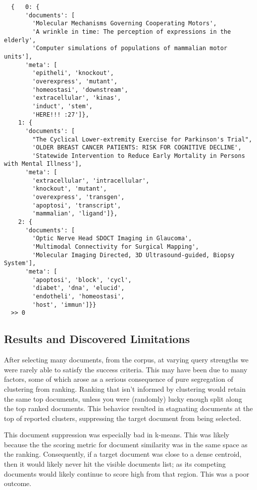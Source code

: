 \documentclass[11pt]{article}
\begin{document}
\begin{lstlisting}
  {   0: {
      'documents': [
        'Molecular Mechanisms Governing Cooperating Motors',
        'A wrinkle in time: The perception of expressions in the elderly',
        'Computer simulations of populations of mammalian motor units'],
      'meta': [
        'epitheli', 'knockout',
        'overexpress', 'mutant',
        'homeostasi', 'downstream',
        'extracellular', 'kinas',
        'induct', 'stem',
        'HERE!!! :27']},
    1: {
      'documents': [
        "The Cyclical Lower-extremity Exercise for Parkinson's Trial",
        'OLDER BREAST CANCER PATIENTS: RISK FOR COGNITIVE DECLINE',
        'Statewide Intervention to Reduce Early Mortality in Persons with Mental Illness'],
      'meta': [
        'extracellular', 'intracellular',
        'knockout', 'mutant',
        'overexpress', 'transgen',
        'apoptosi', 'transcript',
        'mammalian', 'ligand']},
    2: {
      'documents': [
        'Optic Nerve Head SDOCT Imaging in Glaucoma',
        'Multimodal Connectivity for Surgical Mapping',
        'Molecular Imaging Directed, 3D Ultrasound-guided, Biopsy System'],
      'meta': [
        'apoptosi', 'block', 'cycl',
        'diabet', 'dna', 'elucid',
        'endotheli', 'homeostasi',
        'host', 'immun']}}
  >> 0
\end{lstlisting}


\subsection{Results and Discovered Limitations}
After selecting many documents, from the corpus, at varying query strengths we were
rarely able to satisfy the success criteria. This may have been due to many factors,
some of which arose as a serious consequence of pure segregation of clustering from
ranking. Ranking that isn't informed by clustering would retain the same top documents,
unless you were (randomly) lucky enough split along the top ranked documents. This
behavior resulted in stagnating documents at the top of reported clusters, suppressing
the target document from being selected.

This document suppression was especially bad in k-means. This was likely because the
the scoring metric for document similarity was in the same space as the ranking.
Consequently, if a target document was close to a dense centroid, then it would likely
never hit the visible documents list; as its competing documents would likely
continue to score high from that region. This was a poor outcome.
\end{document}

